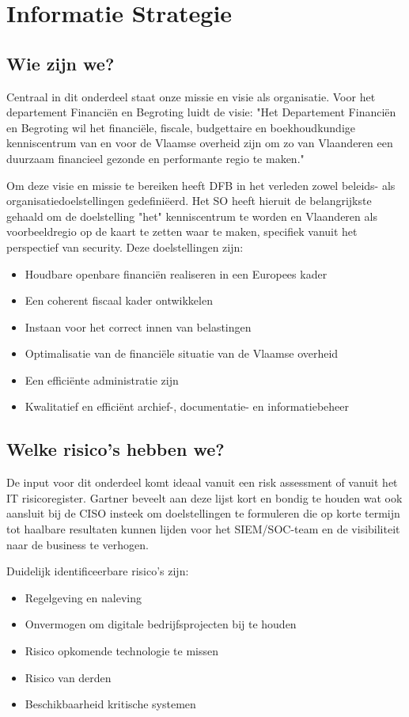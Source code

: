 \documentclass[11pt]{article}
\begin{document}
\section{Informatie Strategie}
\label{sec:orgf3c628b}
\subsection{Wie zijn we?}
\label{sec:org6e7c1e2}
Centraal in dit onderdeel staat onze missie en visie als organisatie. Voor het departement Financiën en Begroting luidt de visie: "Het Departement Financiën en Begroting wil het 
financiële, fiscale, budgettaire en boekhoudkundige kenniscentrum van en voor de Vlaamse overheid zijn om zo van Vlaanderen een duurzaam financieel gezonde en performante regio te maken."

Om deze visie en missie te bereiken heeft DFB in het verleden zowel beleids- als organisatiedoelstellingen gedefiniëerd. Het SO heeft hieruit de belangrijkste gehaald om de doelstelling "het" kenniscentrum
te worden en Vlaanderen als voorbeeldregio op de kaart te zetten waar te maken, specifiek vanuit het perspectief van security. Deze doelstellingen zijn:
\begin{itemize}
\item Houdbare openbare financiën realiseren in een Europees kader
\item Een coherent fiscaal kader ontwikkelen
\item Instaan voor het correct innen van belastingen
\item Optimalisatie van de financiële situatie van de Vlaamse overheid
\item Een efficiënte administratie zijn
\item Kwalitatief en efficiënt archief-, documentatie- en informatiebeheer
\end{itemize}

\subsection{Welke risico's hebben we?}
\label{sec:org742e624}
De input voor dit onderdeel komt ideaal vanuit een risk assessment of vanuit het IT risicoregister. Gartner beveelt aan deze lijst kort en bondig te houden wat ook aansluit bij de CISO insteek om
doelstellingen te formuleren die op korte termijn tot haalbare resultaten kunnen lijden voor het SIEM/SOC-team en de visibiliteit naar de business te verhogen.

Duidelijk identificeerbare risico's zijn:
\begin{itemize}
\item Regelgeving en naleving
\item Onvermogen om digitale bedrijfsprojecten bij te houden
\item Risico opkomende technologie te missen
\item Risico van derden
\item Beschikbaarheid kritische systemen
\end{itemize}
\end{document}
